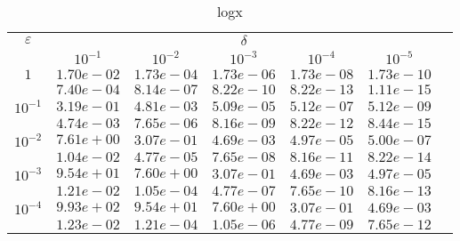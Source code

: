 \documentclass[10pt,twoside]{uz_kgu}
\begin{document}
\begin{table} [!htb]
	\caption {logx}
	\begin{center}
		\begin{tabular}{|c|c|c|c|c|c|c}
			\cline{1-6} $\varepsilon$ & \multicolumn{5}{c|}{$\delta$} \\
			\cline{2-6} &$10^{-1}$ & $10^{-2}$ & $10^{-3}$  & $10^{-4}$& $10^{-5}$\\
			\cline{1-6}
			$1$
			&$1.70e-02$&$1.73e-04$&$1.73e-06$&$1.73e-08$& $1.73e-10$\\
			&$7.40e-04$&$8.14e-07$&$8.22e-10$&$8.22e-13$& $1.11e-15$\\
			\cline{1-6}
			$10^{-1}$
			&$3.19e-01$&$4.81e-03$&$5.09e-05$&$5.12e-07$&$5.12e-09$\\
			&$4.74e-03$&$7.65e-06$&$8.16e-09$&$8.22e-12$&$8.44e-15$\\
			\cline{1-6}
			$10^{-2}$
			&$7.61e+00$&$3.07e-01$&$4.69e-03$&$4.97e-05$&$5.00e-07$\\
			&$1.04e-02$&$4.77e-05$&$7.65e-08$&$8.16e-11$&$8.22e-14$\\
			\cline{1-6}
			$10^{-3}$
			&$9.54e+01$&$7.60e+00$&$3.07e-01$&$4.69e-03$&$4.97e-05$\\
			&$1.21e-02$&$1.05e-04$&$4.77e-07$&$7.65e-10$&$8.16e-13$\\
			\cline{1-6}
			$10^{-4}$
			&$9.93e+02$&$9.54e+01$&$7.60e+00$&$3.07e-01$&$4.69e-03$\\
			&$1.23e-02$&$1.21e-04$&$1.05e-06$&$4.77e-09$&$7.65e-12$\\
			\cline{1-6}
		\end{tabular}
	\end{center}
\end{table}
\end{document}
